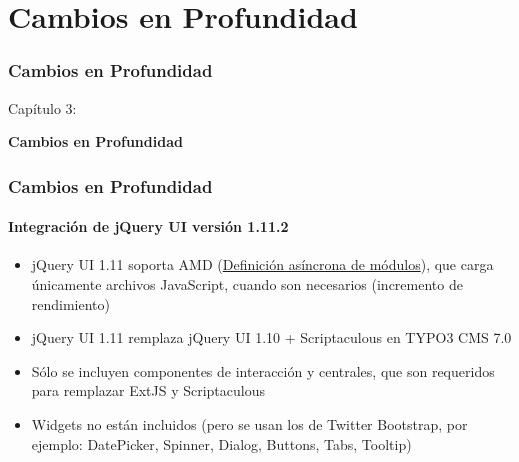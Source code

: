 %

\section{Cambios en Profundidad}
\begin{frame}[fragile]
	\frametitle{Cambios en Profundidad}

	\begin{center}\huge{Capítulo 3:}\end{center}
	\begin{center}\huge{\color{typo3darkgrey}\textbf{Cambios en Profundidad}}\end{center}

\end{frame}


\begin{frame}[fragile]
	\frametitle{Cambios en Profundidad}
	\framesubtitle{Integración de jQuery UI versión 1.11.2}

	\begin{itemize}
		\item jQuery UI 1.11 soporta AMD
			(\href{https://es.wikipedia.org/wiki/Asynchronous_module_definition}{Definición asíncrona de módulos}),
			que carga únicamente archivos JavaScript, cuando son necesarios (incremento de rendimiento)

    	\item jQuery UI 1.11 remplaza jQuery UI 1.10 + Scriptaculous en TYPO3 CMS 7.0

    	\item Sólo se incluyen componentes de interacción y centrales, que son requeridos para remplazar ExtJS y Scriptaculous

    	\item Widgets no están incluidos (pero se usan los de Twitter Bootstrap,
    		por ejemplo: DatePicker, Spinner, Dialog, Buttons, Tabs, Tooltip)

	\end{itemize}

\end{frame}

